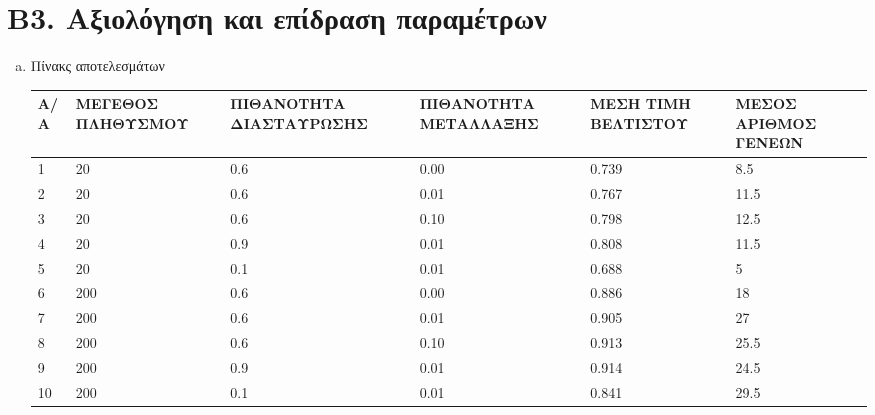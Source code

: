 \documentclass[12pt,a4paper]{article}
\begin{document}
            \section*{Β3. Αξιολόγηση και επίδραση παραμέτρων}
                \begin{enumerate}[a)]


                    \item Πίνακς αποτελεσμάτων \\
                     \begin{tabular}{|p{2em}| p{7em} | p{7em} | p{7em} | p{6.5em} | p{6em} | }
                        \hline
                        \textbf{Α/Α} & \textbf{ΜΕΓΕΘΟΣ ΠΛΗΘΥΣΜΟΥ} &
                        \textbf{ΠΙΘΑΝΟΤΗΤΑ
                            ΔΙΑΣΤΑΥΡΩΣΗΣ} & \textbf{ΠΙΘΑΝΟΤΗΤΑ
                        ΜΕΤΑΛΛΑΞΗΣ} & \textbf{ΜΕΣΗ ΤΙΜΗ ΒΕΛΤΙΣΤΟΥ} & \textbf{ΜΕΣΟΣ
                    ΑΡΙΘΜΟΣ ΓΕΝΕΩΝ}\\
                        \hline
                        1  & 20  & 0.6 & 0.00 & 0.739 & 8.5  \\
                        \hline
                        2  & 20  & 0.6 & 0.01 & 0.767 & 11.5  \\
                        \hline
                        3  & 20  & 0.6 & 0.10 & 0.798 & 12.5 \\
                        \hline
                        4  & 20  & 0.9 & 0.01 & 0.808 & 11.5 \\
                        \hline
                        5  & 20  & 0.1 & 0.01 & 0.688 & 5 \\
                        \hline
                        6  & 200 & 0.6 & 0.00 & 0.886 & 18 \\
                        \hline
                        7  & 200 & 0.6 & 0.01 & 0.905 & 27 \\
                        \hline
                        8  & 200 & 0.6 & 0.10 & 0.913 & 25.5 \\
                        \hline
                        9  & 200 & 0.9 & 0.01 & 0.914 & 24.5 \\
                        \hline
                        10 & 200 & 0.1 & 0.01 & 0.841 & 29.5 \\
                        \hline
                \end{tabular}


\end{enumerate}
\end{document}
